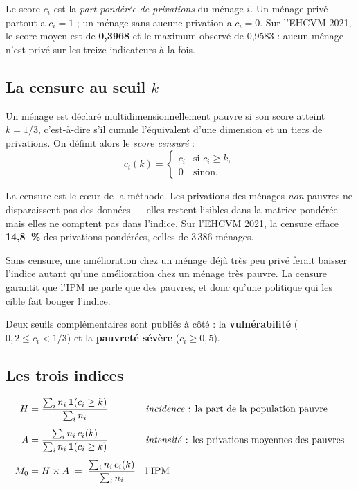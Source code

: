 \documentclass[11pt,a4paper]{article}
\begin{document}
Le score $c_i$ est la \emph{part pondérée de privations} du ménage $i$. Un ménage privé partout a
$c_i = 1$ ; un ménage sans aucune privation a $c_i = 0$. Sur l'EHCVM 2021, le score moyen est de
\textbf{0,3968} et le maximum observé de 0,9583 : aucun ménage n'est privé sur les treize
indicateurs à la fois.

\subsection{La censure au seuil \texorpdfstring{$k$}{k}}

Un ménage est déclaré multidimensionnellement pauvre si son score atteint $k = 1/3$, c'est-à-dire
s'il cumule l'équivalent d'une dimension et un tiers de privations. On définit alors le
\emph{score censuré} :
\[
c_i(k) =
\begin{cases}
c_i & \text{si } c_i \ge k,\\
0 & \text{sinon.}
\end{cases}
\]

La censure est le cœur de la méthode. Les privations des ménages \emph{non} pauvres ne
disparaissent pas des données --- elles restent lisibles dans la matrice pondérée --- mais elles
ne comptent pas dans l'indice. Sur l'EHCVM 2021, la censure efface \textbf{14,8~\%} des privations
pondérées, celles de 3\,386 ménages.

\begin{retenir}
Sans censure, une amélioration chez un ménage déjà très peu privé ferait baisser l'indice autant
qu'une amélioration chez un ménage très pauvre. La censure garantit que l'IPM ne parle que des
pauvres, et donc qu'une politique qui les cible fait bouger l'indice.
\end{retenir}

Deux seuils complémentaires sont publiés à côté : la \textbf{vulnérabilité}
($0{,}2 \le c_i < 1/3$) et la \textbf{pauvreté sévère} ($c_i \ge 0{,}5$).

\subsection{Les trois indices}

\begin{align}
H  &= \frac{\sum_i n_i \, \mathbf{1}(c_i \ge k)}{\sum_i n_i}
   && \text{\emph{incidence} : la part de la population pauvre} \\[4pt]
A  &= \frac{\sum_i n_i \, c_i(k)}{\sum_i n_i \, \mathbf{1}(c_i \ge k)}
   && \text{\emph{intensité} : les privations moyennes des pauvres} \\[4pt]
M_{0} &= H \times A \;=\; \frac{\sum_i n_i \, c_i(k)}{\sum_i n_i}
   && \text{l'IPM}
\end{align}
\end{document}

